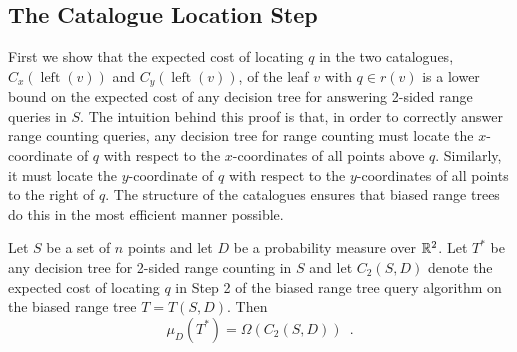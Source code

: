 \documentclass[lotsofwhite,charterfonts]{patmorin}
\DeclareMathOperator{\lft}{left}
\begin{document}
\subsection{The Catalogue Location Step}

First we show that the expected cost of locating $q$ in the two
catalogues, $C_x(\lft(v))$ and $C_y(\lft(v))$, of the leaf $v$
with $q\in r(v)$ is
a lower bound on the expected cost of any decision tree for answering
2-sided range queries in $S$.  The intuition behind this proof is
that, in order to correctly answer range counting queries, any decision tree
for range counting must locate the $x$-coordinate of $q$
with respect to the $x$-coordinates of all points above $q$.  
Similarly, it must locate the $y$-coordinate of $q$ with respect to
the $y$-coordinates of all points to the right of $q$.  The structure
of the catalogues ensures that biased range trees do this in the most
efficient manner possible.
 

\begin{lem}
Let $S$ be a set of $n$ points and let $D$ be a probability measure
over $\mathbb{R}^2$.
Let $T^*$ be any decision tree for 2-sided range counting in $S$ and let
$C_2(S,D)$ denote the expected cost of locating $q$ in Step 2 of the
biased range tree query algorithm on the biased range tree $T=T(S,D)$. 
Then
\[
  \mu_D(T^*) = \Omega(C_2(S,D)) \enspace .
\] 
\end{lem}
\end{document}
